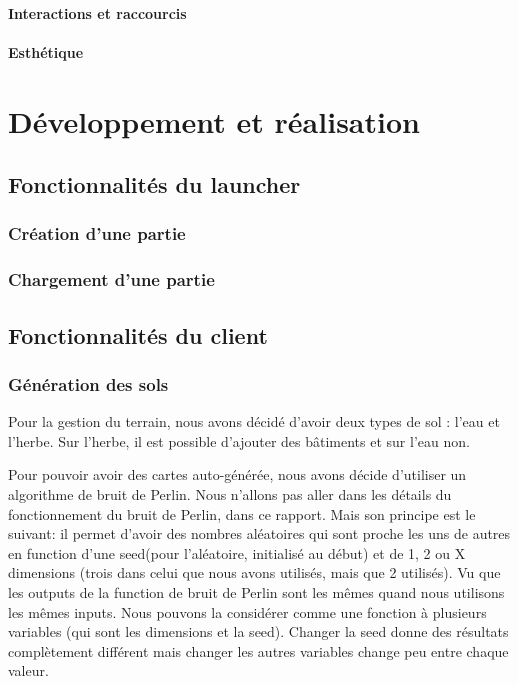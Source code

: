 \documentclass[a4paper,10pt,openany,oneside]{report}
\begin{document}
\subsubsection{Interactions et raccourcis}

\subsubsection{Esthétique}


\chapter{Développement et réalisation}
\thispagestyle{headings}
\section{Fonctionnalités du launcher}
\subsection{Création d'une partie}
\subsection{Chargement d'une partie}
\section{Fonctionnalités du client}
\subsection{Génération des sols}
Pour la gestion du terrain, nous avons décidé d'avoir deux types de sol : l'eau et l'herbe. Sur l'herbe, il est possible d'ajouter des bâtiments et sur l'eau non.

Pour pouvoir avoir des cartes auto-générée, nous avons décide d'utiliser un algorithme de bruit de Perlin. Nous n'allons pas aller dans les détails du fonctionnement du bruit de Perlin, dans ce rapport. Mais son principe est le suivant: il permet d'avoir des nombres aléatoires qui sont proche les uns de autres en function d'une seed(pour l'aléatoire, initialisé au début) et de 1, 2 ou X dimensions (trois dans celui que nous avons utilisés, mais que 2 utilisés). Vu que les outputs de la function de bruit de Perlin sont les mêmes quand nous utilisons les mêmes inputs. Nous pouvons la considérer comme une fonction à plusieurs variables (qui sont les dimensions et la seed). Changer la seed donne des résultats complètement différent mais changer les autres variables change peu entre chaque valeur.
\end{document}
